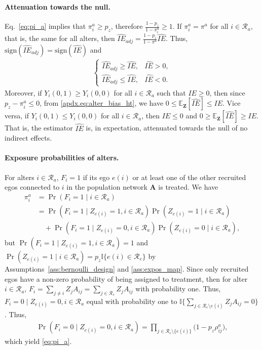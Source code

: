 \documentclass[11pt]{article}
\theoremstyle{definition}
\def \bZ {\boldsymbol{Z}}
\def \bA {\boldsymbol{A}}
\def \cR {\mathcal{R}}
\def \EX {\mathbb{E}}
\begin{document}
\paragraph{Attenuation towards the null.}
Eq.~\eqref{eq:pi_a} implies that $\pi^a_i \geq p_z$, therefore $\frac{1-p_z}{1-\pi^a_i} \geq 1$.
If $\pi^a_i = \pi^a$ for all $i\in\cR_a$, that is, the same for all alters, then $\widehat{IE}_{adj}=\frac{1-p_z}{1-\pi^a}\widehat{IE}$. Thus, $\text{sign}(\widehat{IE}_{adj})=\text{sign}(\widehat{IE})$ and 
\begin{align*}
    \begin{cases}
        \widehat{IE}_{adj} \geq \widehat{IE}, & \widehat{IE} > 0, \\
        \widehat{IE}_{adj} \leq \widehat{IE}, & \widehat{IE} < 0.
    \end{cases}
\end{align*}
Moreover, if $Y_i(0,1) \geq Y_i(0,0)$ for all $i \in \cR_a$ such that $IE\geq0$, 
then since $p_z - \pi_i^a \leq 0$, from \eqref{apdx.eq:alter_bias_ht}, 
we have $0\leq \EX_{\bZ}\left[\widehat{IE}\right] \leq IE$. 
Vice versa, if $Y_i(0,1) \leq Y_i(0,0)$ for all $i \in \cR_a$,
 then $IE \leq 0$ and $0 \geq \EX_{\bZ}\left[\widehat{IE}\right] \geq IE$. 
 That is, the estimator $\widehat{IE}$ is, in expectation, attenuated towards the null of no indirect effects.

\paragraph{Exposure probabilities of alters.}
For alters $i\in\cR_a$, $F_i=1$ if its ego $e(i)$ or at least one of the other recruited egos connected to $i$ in the population network $\bA$ is treated. We have
\begin{align*}
    \pi^a_i &= \Pr(F_i=1 \mid i\in \cR_a) 
    \\ &=
    \Pr(F_i=1 \mid Z_{e(i)}=1, i\in \cR_a)\Pr(Z_{e(i)}=1\mid i \in \cR_a) 
    \\ &\quad + \Pr(F_i=1 \mid Z_{e(i)}=0, i\in \cR_a)\Pr(Z_{e(i)}=0\mid i \in \cR_a),
\end{align*}
but $\Pr(F_i=1 \mid Z_{e(i)}=1, i\in \cR_a)=1$ and $\Pr(Z_{e(i)}=1\mid i \in \cR_a)=p_z \mathbb{I}\{e(i) \in \cR_e\}$ by Assumptions~\ref{ass:bernoulli_design} and \ref{ass:expos_map}. Since only recruited egos have a non-zero probability of being assigned to treatment, then for alter $i\in \cR_a$, $F_i = \sum_{j\neq i}Z_jA_{ij}=\sum_{j \in \cR_e}Z_jA_{ij}$ with probability one. Thus, $F_i = 0 \mid  Z_{e(i)}=0, i\in \cR_a$ equal with probability one to $\mathbb{I}\{\sum_{j \in \cR_e \setminus e(i)}Z_jA_{ij}=0\}$. Thus,
\begin{align*}
    \Pr(F_i=0 \mid Z_{e(i)}=0, i\in \cR_a) =
    \prod_{j \in  \cR_e \setminus \{e(i)\}}
    \big(1 - p_z \rho^a_{ij}\big),
\end{align*}
which yield \eqref{eq:pi_a}.
\end{document}
